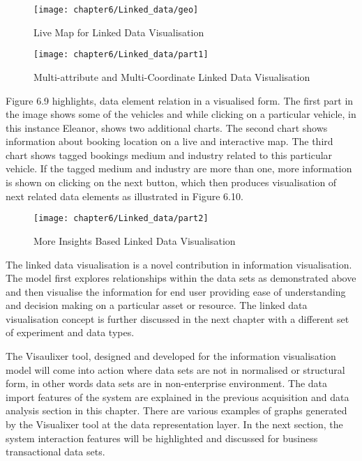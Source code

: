 \begin{figure}
\centering
\texttt{[image: chapter6/Linked\_data/geo]}
\caption{Live Map for Linked Data Visualisation}
\end{figure}

\begin{figure}
\centering
\texttt{[image: chapter6/Linked\_data/part1]}
\caption{Multi-attribute and Multi-Coordinate Linked Data Visualisation}
\end{figure}

Figure 6.9 highlights, data element relation in a visualised form. The first part in the image shows some of the vehicles and while clicking on a particular vehicle, in this instance Eleanor, shows two additional charts. The second chart shows information about booking location on a live and interactive map. The third chart shows tagged bookings medium and industry related to this particular vehicle. If the tagged medium and industry are more than one, more information is shown on clicking on the next button, which then produces visualisation of next related data elements as illustrated in Figure 6.10.

\begin{figure}
\centering
\texttt{[image: chapter6/Linked\_data/part2]}
\caption{More Insights Based Linked Data Visualisation}
\end{figure}

The linked data visualisation is a novel contribution in information visualisation. The model first explores relationships within the data sets as demonstrated above and then visualise the information for end user providing ease of understanding and decision making on a particular asset or resource. The linked data visualisation concept is further discussed in the next chapter with a different set of experiment and data types.

The Visaulixer tool, designed and developed for the information visualisation model will come into action where data sets are not in normalised or structural form, in other words data sets are in non-enterprise environment. The data import features of the system are explained in the previous acquisition and data analysis section in this chapter. There are various examples of graphs generated by the Visualixer tool at the data representation layer. In the next section, the system interaction features will be highlighted and discussed for business transactional data sets.

